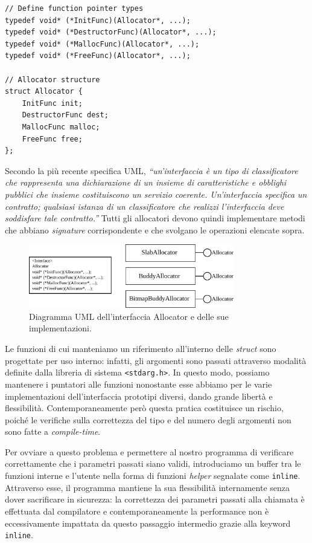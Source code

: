\begin{lstlisting}
// Define function pointer types
typedef void* (*InitFunc)(Allocator*, ...);
typedef void* (*DestructorFunc)(Allocator*, ...);
typedef void* (*MallocFunc)(Allocator*, ...);  
typedef void* (*FreeFunc)(Allocator*, ...); 

// Allocator structure
struct Allocator {
    InitFunc init; 
    DestructorFunc dest;
    MallocFunc malloc;
    FreeFunc free; 
};
\end{lstlisting}

Secondo la più recente specifica UML, \textit{“un'interfaccia è un tipo di classificatore che rappresenta una dichiarazione di un insieme di caratteristiche e obblighi pubblici che insieme costituiscono un servizio coerente. Un'interfaccia specifica un contratto; qualsiasi istanza di un classificatore che realizzi l'interfaccia deve soddisfare tale contratto.”} Tutti gli allocatori devono quindi implementare metodi che abbiano \textit{signature} corrispondente e che svolgano le operazioni elencate sopra.

\begin{figure}[H]
    \centering
    \includegraphics[width=0.8\textwidth]{images/allocator_interface_uml.pdf}
    \caption{Diagramma UML dell'interfaccia Allocator e delle sue implementazioni.}
    \label{fig:uml_allocator_interface}
\end{figure}

Le funzioni di cui manteniamo un riferimento all'interno delle \textit{struct} sono progettate per uso interno: infatti, gli argomenti sono passati attraverso modalità definite dalla libreria di sistema \texttt{<stdarg.h>}. In questo modo, possiamo mantenere i puntatori alle funzioni nonostante esse abbiamo per le varie implementazioni dell'interfaccia prototipi diversi, dando grande libertà e flessibilità. Contemporaneamente però questa pratica costituisce un rischio, poiché le verifiche sulla correttezza del tipo e del numero degli argomenti non sono fatte a \textit{compile-time}.

Per ovviare a questo problema e permettere al nostro programma di verificare correttamente che i parametri passati siano validi, introduciamo un buffer tra le funzioni interne e l’utente nella forma di funzioni \textit{helper} segnalate come \texttt{inline}. Attraverso esse, il programma mantiene la sua flessibilità internamente senza dover sacrificare in sicurezza: la correttezza dei parametri passati alla chiamata è effettuata dal compilatore e contemporaneamente la performance non è eccessivamente impattata da questo passaggio intermedio grazie alla keyword \texttt{inline}. 

